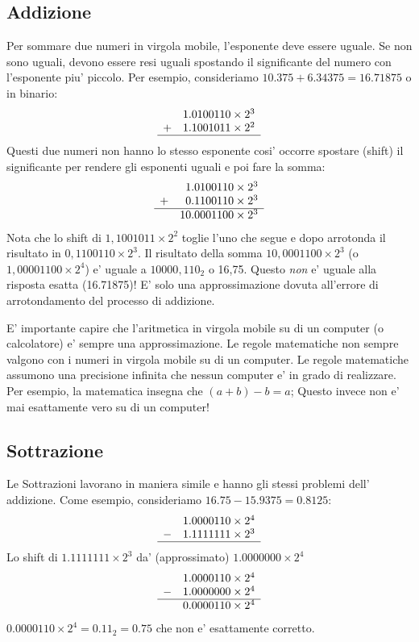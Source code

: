 \subsection{Addizione}

Per sommare due numeri in virgola mobile, l'esponente deve essere
uguale. Se non sono uguali, devono essere resi uguali spostando
il significante del numero con l'esponente piu' piccolo. Per esempio,
consideriamo $10.375 + 6.34375 = 16.71875$ o in binario:
\[
\begin{array}{rr}
 & 1.0100110 \times 2^3 \\
+& 1.1001011 \times 2^2 \\ \hline
\end{array}
\]
Questi due numeri non hanno lo stesso esponente cosi' occorre spostare
(shift) il significante per rendere gli esponenti uguali e poi fare
la somma:
\[
\begin{array}{rr@{.}l}
 &  1&0100110 \times 2^3 \\
+&  0&1100110 \times 2^3 \\ \hline
 & 10&0001100 \times 2^3
\end{array}
\]
Nota che lo shift di $1,1001011 \times 2^2$ toglie l'uno che segue e dopo
arrotonda il risultato in $0,1100110 \times 2^3$. Il risultato della 
somma $10,0001100 \times 2^3$ (o $1,00001100 \times 2^4$) e' uguale a
$10000,110_2$ o 16,75. Questo \emph{non} e' uguale alla risposta esatta
(16.71875)! E' solo una approssimazione dovuta all'errore di arrotondamento 
del processo di addizione.

E' importante capire che l'aritmetica in virgola mobile su di un
computer (o calcolatore) e' sempre una approssimazione. Le regole
matematiche non sempre valgono con i numeri in virgola mobile su di
un computer. Le regole matematiche assumono una precisione infinita
che nessun computer e' in grado di realizzare. Per esempio, la 
matematica insegna che $(a + b) - b = a$; Questo invece non e' mai
esattamente vero su di un computer!

\subsection{Sottrazione}
Le Sottrazioni lavorano in maniera simile e hanno gli stessi problemi dell'
addizione. Come esempio, consideriamo $16.75 - 15.9375 = 0.8125$:
\[
\begin{array}{rr}
 & 1.0000110 \times 2^4 \\
-& 1.1111111 \times 2^3 \\ \hline
\end{array}
\]
Lo shift di $1.1111111 \times 2^3$ da' (approssimato) $1.0000000 \times 2^4$
\[
\begin{array}{rr}
 & 1.0000110 \times 2^4 \\
-& 1.0000000 \times 2^4 \\ \hline
 & 0.0000110 \times 2^4
\end{array}
\]
$0.0000110 \times 2^4 = 0.11_2 = 0.75$ che non e' esattamente corretto.

